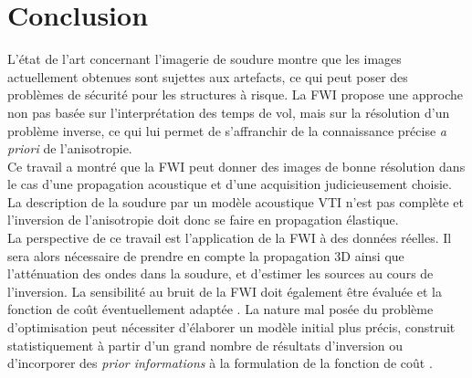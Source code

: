 \chapter*{Conclusion}

L'état de l'art concernant l'imagerie de soudure montre que les images actuellement obtenues sont sujettes aux artefacts, ce qui peut poser des problèmes de sécurité pour les structures à risque. La FWI propose une approche non pas basée sur l'interprétation des temps de vol, mais sur la résolution d'un problème inverse, ce qui lui permet de s'affranchir de la connaissance précise \emph{a priori} de l'anisotropie.\\

Ce travail a montré que la FWI peut donner des images de bonne résolution dans le cas d'une propagation acoustique et d'une acquisition judicieusement choisie. La description de la soudure par un modèle acoustique VTI n'est pas complète et l'inversion de l'anisotropie doit donc se faire en propagation élastique.\\


La perspective de ce travail est l'application de la FWI à des données réelles. Il sera alors nécessaire de prendre en compte la propagation 3D ainsi que l'atténuation des ondes dans la soudure, et d'estimer les sources au cours de l'inversion. La sensibilité au bruit de la FWI doit également être évaluée et la fonction de coût éventuellement adaptée \citep{brossier_2010}. La nature mal posée du problème d'optimisation peut nécessiter d'élaborer un modèle initial plus précis, construit statistiquement à partir d'un grand nombre de résultats d'inversion ou d'incorporer des \emph{prior informations} à la formulation de la fonction de coût \citep{asnaashari}.

















